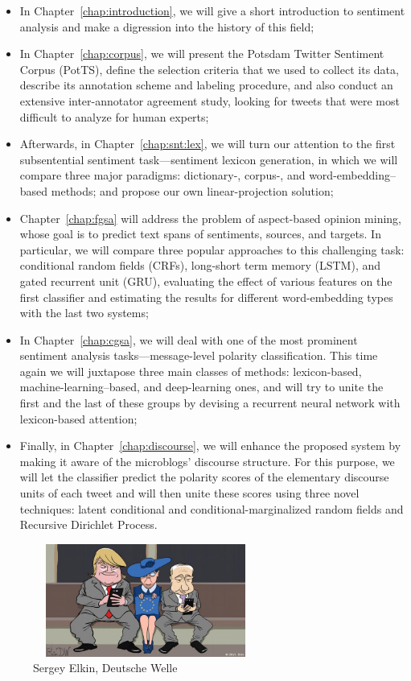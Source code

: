 \begin{itemize}
\item In Chapter~\ref{chap:introduction}, we will give a short
  introduction to sentiment analysis and make a digression into the
  history of this field;

\item In Chapter~\ref{chap:corpus}, we will present the Potsdam
  Twitter Sentiment Corpus (PotTS), define the selection criteria that
  we used to collect its data, describe its annotation scheme and
  labeling procedure, and also conduct an extensive inter-annotator
  agreement study, looking for tweets that were most difficult to
  analyze for human experts;

\item Afterwards, in Chapter~\ref{chap:snt:lex}, we will turn our
  attention to the first subsentential sentiment task---sentiment
  lexicon generation, in which we will compare three major paradigms:
  dictionary-, corpus-, and word-embedding--based methods; and propose
  our own linear-projection solution;

\item Chapter~\ref{chap:fgsa} will address the problem of aspect-based
  opinion mining, whose goal is to predict text spans of sentiments,
  sources, and targets.  In particular, we will compare three popular
  approaches to this challenging task: conditional random fields
  (CRFs), long-short term memory (LSTM), and gated recurrent unit
  (GRU), evaluating the effect of various features on the first
  classifier and estimating the results for different word-embedding
  types with the last two systems;

\item In Chapter~\ref{chap:cgsa}, we will deal with one of the most
  prominent sentiment analysis tasks---message-level polarity
  classification.  This time again we will juxtapose three main
  classes of methods: lexicon-based, machine-learning--based, and
  deep-learning ones, and will try to unite the first and the last of
  these groups by devising a recurrent neural network with
  lexicon-based attention;

\item Finally, in Chapter~\ref{chap:discourse}, we will enhance the
  proposed system by making it aware of the microblogs' discourse
  structure.  For this purpose, we will let the classifier predict the
  polarity scores of the elementary discourse units of each tweet and
  will then unite these scores using three novel techniques: latent
  conditional and conditional-marginalized random fields and Recursive
  Dirichlet Process.
\end{itemize}
\vfill
\begin{figure}[htb!]
  \centering \includegraphics[width=20em,height=10em]{img/putin-trump.jpg}
  \caption*{\small\textcopyright Sergey Elkin, Deutsche Welle}
\end{figure}
